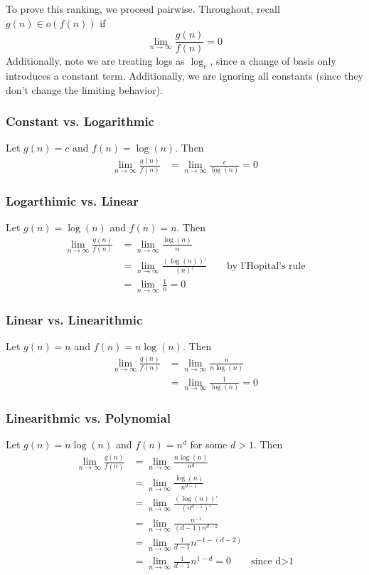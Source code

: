 \documentclass[paper=a4, fontsize=11pt]{scrartcl} %
\numberwithin{equation}{section} %
\numberwithin{figure}{section} %
\numberwithin{table}{section} %
\begin{document}
To prove this ranking, we proceed pairwise. Throughout, recall $g(n) \in o(f(n))$ if
\[\lim_{n \to \infty} \frac{g(n)}{f(n)} = 0\]
Additionally, note we are treating logs as $\log_e$, since a change of basis only introduces a constant term. Additionally, we are ignoring all constants (since they don't change the limiting behavior). 

\subsubsection*{Constant vs. Logarithmic}
Let $g(n)=c$ and $f(n) = \log(n)$. Then
\begin{align*}
\lim_{n \to \infty} \frac{g(n)}{f(n)} &= \lim_{n \to \infty} \frac{c}{\log(n)} = 0
\end{align*}

\subsubsection*{Logarthimic vs. Linear}
Let $g(n)=\log(n)$ and $f(n) = n$. Then
\begin{align*}
\lim_{n \to \infty} \frac{g(n)}{f(n)} &= \lim_{n \to \infty} \frac{\log(n)}{n} \\
	&= \lim_{n \to \infty} \frac{(\log(n))'}{(n)'} \qquad{} \textrm{by l'Hopital's rule}\\
	&= \lim_{n \to \infty} \frac{1}{n} = 0
\end{align*}

\subsubsection*{Linear vs. Linearithmic}
Let $g(n)=n$ and $f(n) = n\log(n)$. Then
\begin{align*}
\lim_{n \to \infty} \frac{g(n)}{f(n)} &= \lim_{n \to \infty} \frac{n}{n\log(n)} \\
	&= \lim_{n \to \infty} \frac{1}{\log(n)} = 0
\end{align*}

\subsubsection*{Linearithmic vs. Polynomial}
Let $g(n)=n\log(n)$ and $f(n) = n^d$ for some $d>1$. Then
\begin{align*}
\lim_{n \to \infty} \frac{g(n)}{f(n)} &= \lim_{n \to \infty} \frac{n\log(n)}{n^d} \\
	&= \lim_{n \to \infty} \frac{\log(n)}{n^{d-1}} \\
	&= \lim_{n \to \infty} \frac{(\log(n))'}{(n^{d-1})'} \\
	&= \lim_{n \to \infty} \frac{n^{-1}}{(d-1)n^{d-2}} \\
	&= \lim_{n \to \infty} \frac{1}{d-1}n^{-1-(d-2)} \\
	&= \lim_{n \to \infty} \frac{1}{d-1}n^{1-d} = 0 \qquad{} \textrm{since d>1}\\
\end{align*}
\end{document}
